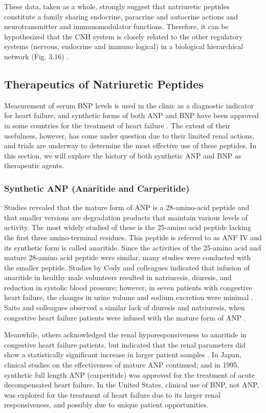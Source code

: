 \documentclass[14pt,a4paper,onecolumn]{extarticle}
\begin{document}
These data, taken as a whole, strongly suggest that natriuretic peptides constitute a family sharing endocrine, paracrine and autocrine actions and neurotransmitter and immunomodulator functions. Therefore, it can be hypothesized that the CNH system is closely related to the other regulatory systems (nervous, endocrine and immuno logical) in a biological hierarchical network (Fig. 3.16) \citep{287} \citep{288}.



\subsection{Therapeutics of Natriuretic Peptides}

Measurement of serum BNP levels is used in the clinic as a diagnostic indicator for heart failure, and synthetic forms of both ANP and BNP have been approved in some countries for the treatment of heart failure \citep{Gardner2003a}. The extent of their usefulness, however, has come under question due to their limited renal actions, and trials are underway to determine the most effective use of these peptides. In this section, we will explore the history of both synthetic ANP and BNP as therapeutic agents. %

\subsubsection{Synthetic ANP (Anaritide and Carperitide)}
Studies revealed that the mature form of ANP is a 28-amino-acid peptide and that smaller versions are degradation products that maintain various levels of activity. The most widely studied of these is the 25-amino acid peptide lacking the first three amino-terminal residues. This peptide is referred to as ANF IV and its synthetic form is called anaritide.
Since the activities of the 25-amino acid and mature 28-amino acid peptide were similar, many studies were conducted with the smaller peptide. Studies by Cody and colleagues indicated that infusion of anaritide in healthy male volunteers resulted in natriuresis, diuresis, and reduction in systolic blood pressure; however, in seven patients with congestive heart failure, the changes in urine volume and sodium excretion were minimal \citep{Cody1986}. Saito and colleagues observed a similar lack of diuresis and natriuresis, when congestive heart failure patients were infused with the mature form of ANP \citep{Saito1987}.

Meanwhile, others acknowledged the renal hyporesponsiveness to anaritide in congestive heart failure patients, but indicated that the renal parameters did show a statistically significant increase in larger patient samples \citep{Fifer1990}. In Japan, clinical studies on the effectiveness of mature ANP continued; and in 1995, synthetic full length ANP (carperitide) was approved for the treatment of acute decompensated heart failure. In the United States, clinical use of BNP, not ANP, was explored for the treatment of heart failure due to its larger renal responsiveness, and possibly due to unique patient opportunities. %
\end{document}
